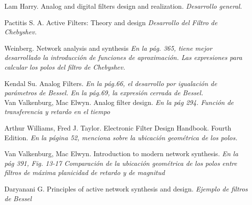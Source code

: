 \documentclass[informe.tex]{subfiles}
\begin{document}
Lam Harry. Analog and digital filters design and realization.\newline 
\tab[1cm]\textit{ Desarrollo general.}\newline

Pactitis S. A. Active Filters: Theory and design\newline
\tab[1cm]\textit{ Desarrollo del Filtro de Chebyshev.}\newline

Weinberg. Network analysis and synthesis\newline
\tab[1cm]\textit{En la pág. 365, tiene mejor desarrollado la introducción de funciones de aproximación.\newline
\tab[1cm]Las expresiones para calcular los polos del filtro de Chebyshev. }\newline

Kendal Su. Analog Filters.\newline
\tab[1cm]\textit{ En la pág.66, el desarrollo por igualación de parámetros de Bessel.}\newline
\tab[1cm]\textit{ En la pág.69, la expresión cerrada de Bessel.}\\

Van Valkenburg, Mac Elwyn. Analog filter design.\newline
\tab[1cm]\textit{En la pág 294. Función de transferencia y retardo en el tiempo}\newline

Arthur Williams, Fred J. Taylor.  Electronic Filter Design Handbook. Fourth Edition.\newline
\tab[1cm]\textit{ En la página 52, menciona sobre la ubicación geométrica de los polos.}\newline

Van Valkenburg, Mac Elwyn. Introduction to modern network synthesis.\newline
\tab[1cm]\textit{En la pág 391, Fig. 13-17 Comparación de la ubicación geométrica de los polos entre filtros de máxima planicidad de retardo y de magnitud}\newline

Daryanani G. Principles of active network synthesis and design.\newline
\tab[1cm]\textit{Ejemplo de filtros de Bessel}\newline
\end{document}
